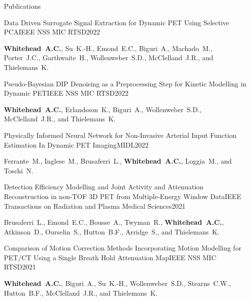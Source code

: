 \documentclass{cv}
\begin{document}
\begin{spacing}{1.0}
\begin{rSection}{Publications}
            \item \begin{rSubsection}{Data Driven Surrogate Signal Extraction for Dynamic PET Using Selective PCA}{}{IEEE NSS MIC RTSD}{2022}
                \item \textbf{Whitehead~A.C.}, Su~K.-H., Emond~E.C., Biguri~A., Machado~M., Porter~J.C., Garthwaite~H., Wollenweber~S.D., McClelland~J.R., and Thielemans~K.
            \end{rSubsection}
            
            \item \begin{rSubsection}{Pseudo-Bayesian DIP Denoising as a Preprocessing Step for Kinetic Modelling in Dynamic \newline PET}{}{IEEE NSS MIC RTSD}{2022}
                \item \textbf{Whitehead~A.C.}, Erlandsson~K., Biguri~A., Wollenweber~S.D., McClelland~J.R., and Thielemans~K.
            \end{rSubsection}
            
            \item \begin{rSubsection}{Physically Informed Neural Network for Non-Invasive Arterial Input Function Estimation In Dynamic PET Imaging}{}{MIDL}{2022}
                \item Ferrante~M., Inglese~M., Brusaferri~L., \textbf{Whitehead~A.C.}, Loggia~M., and Toschi~N.
            \end{rSubsection}
            
            \item \begin{rSubsection}{Detection Efficiency Modelling and Joint Activity and Attenuation Reconstruction in non-TOF 3D PET from Multiple-Energy Window Data}{}{IEEE Transactions on Radiation and Plasma Medical Sciences}{2021}
                \item Brusaferri~L., Emond~E.C., Bousse~A., Twyman~R., \textbf{Whitehead~A.C.}, Atkinson~D., Ourselin~S., Hutton~B.F., Arridge~S., and Thielemans~K.
            \end{rSubsection}
            
            \item \begin{rSubsection}{Comparison of Motion Correction Methods Incorporating Motion Modelling for PET/CT Using a Single Breath Hold Attenuation Map}{}{IEEE NSS MIC RTSD}{2021}
                \item \textbf{Whitehead~A.C.}, Biguri~A., Su~K.-H., Wollenweber~S.D., Stearns~C.W., Hutton~B.F., McClelland~J.R., and Thielemans~K.
            \end{rSubsection}
            

\end{rSection}
\end{spacing}
\end{document}
